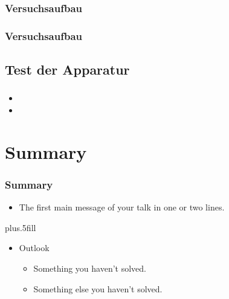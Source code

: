 \documentclass{beamer}
\begin{document}
\begin{frame}
\frametitle{Versuchsaufbau}
\begin{figure}[H]
\centering

\end{figure}
\end{frame}


\begin{frame}
\frametitle{Versuchsaufbau}
\begin{figure}[H]
\centering

\end{figure}
\end{frame}



\subsection[Ergebnisse]{Test der Apparatur}

\begin{frame}
\frametitle{}
\begin{itemize}
  \item
  \item
\end{itemize}
\end{frame}





\section*{Summary}

\begin{frame}
\frametitle<presentation>{Summary}

\begin{itemize}
  \item The \alert{first main message} of your talk in one or two lines.
\end{itemize}




\vskip0pt plus.5fill
\begin{itemize}
  \item Outlook
  \begin{itemize}
    \item Something you haven't solved.
    \item Something else you haven't solved.
  \end{itemize}
\end{itemize}
\end{frame}
\end{document}
